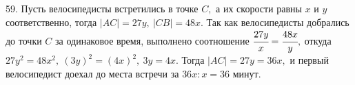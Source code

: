 59. Пусть велосипедисты встретились в точке $C,$ а их скорости равны $x$ и $y$ соответственно, тогда $|AC|=27y,\ |CB|=48x.$ Так как велосипедисты добрались до точки $C$ за одинаковое время, выполнено соотношение $\cfrac{27y}{x}=\cfrac{48x}{y},$ откуда $27y^2=48x^2,\ (3y)^2=(4x)^2,\ 3y=4x.$ Тогда $|AC|=27y=36x,$ и первый велосипедист доехал до места встречи за $36x:x=36$ минут.
\newpage

